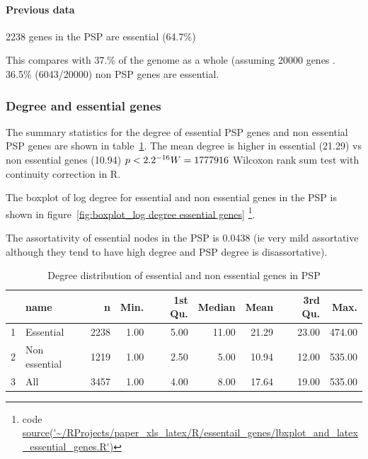 


   


\paragraph{Previous data}
2238 genes in the PSP are essential (64.7\%)

This compares with 37.\% of the genome as a whole (assuming 20000 genes . 36.5\% (6043/20000) non PSP genes are essential. 

\subsubsection{Degree and essential genes}

The summary statistics for the degree of essential PSP genes and non essential PSP genes are shown in table~\ref{tab:degree distribution essential and non essential genes PSP}. The mean degree is higher in essential (21.29) vs non essential genes (10.94) $p<2.2 \time 10^{-16}   W=1777916$ Wilcoxon rank sum test with continuity correction in R.

The boxplot of log degree for essential and non essential genes in the PSP is shown in figure~\ref{fig:boxplot_log degree essential genes}
\footnote{code \url{source('~/RProjects/paper_xls_latex/R/essentail_genes/lbxplot_and_latex_essential_genes.R')}}.

The assortativity of essential nodes in the PSP is 0.0438 (ie very mild assortative although they tend to have high degree and PSP degree is disassortative).


\begin{table}[ht]
\centering
\begin{tabular}{rlrrrrrrr}
  \hline
 & name & n & Min. & 1st Qu. & Median & Mean & 3rd Qu. & Max. \\ 
  \hline
1 & Essential & 2238 & 1.00 & 5.00 & 11.00 & 21.29 & 23.00 & 474.00 \\ 
  2 & Non essential & 1219 & 1.00 & 2.50 & 5.00 & 10.94 & 12.00 & 535.00 \\ 
  3 & All & 3457 & 1.00 & 4.00 & 8.00 & 17.64 & 19.00 & 535.00 \\ 
   \hline
\end{tabular}
\caption{Degree distribution of essential and non essential genes in PSP}
\label{tab:degree distribution essential and non essential genes PSP}
\end{table}




